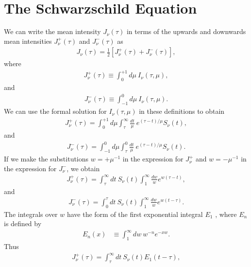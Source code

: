 \newslide

\section{The Schwarzschild Equation}

We can write the mean intensity $J_\nu(\tau)$ in terms
of the upwards and downwards mean intensities
$J_\nu^+(\tau)$ and $J_\nu^-(\tau)$ as
\begin{align}
J_\nu(\tau) = \frac{1}{2} \left[J_\nu^+(\tau) + J_\nu^-(\tau)\right],
\end{align}
where
\begin{align}
J_\nu^+(\tau) \equiv\int_{0}^{+1}\!\!\!d\mu\:I_\nu(\tau,\mu),
\end{align}
and
\begin{align}
J_\nu^-(\tau) \equiv\int_{-1}^{0}\!\!\!d\mu\:I_\nu(\tau,\mu).
\end{align}
We can use the formal solution for $I_\nu(\tau,\mu)$ in
these definitions to obtain
\begin{align}
J_\nu^+(\tau)=
\int_0^{+1}\!\!\!d\mu
\int_{\tau}^\infty\!\!\frac{dt}{\mu}\:e^{(\tau-t)/\mu} S_\nu(t),
\end{align}
and
\begin{align}
J_\nu^-(\tau)=
\int_{-1}^{0}\!\!\!d\mu
\int_{\tau}^0\!\!\frac{dt}{\mu}\:e^{(\tau-t)/\mu} S_\nu(t).
\end{align}
If we make the substitutions $w = +\mu^{-1}$ in the
expression for $J_\nu^+$ and $w = -\mu^{-1}$ in the
expression for $J_\nu^-$, we obtain
\begin{align}
J_\nu^+(\tau)=
\int_{\tau}^\infty\!\!\!dt\:
S_\nu(t)
\int_1^\infty\!\!\frac{dw}{w} e^{w(\tau-t)},
\end{align}
and
\begin{align}
J_\nu^-(\tau)=
\int_0^{\tau}\!\!\!dt\:
S_\nu(t)
\int_1^\infty\!\!\frac{dw}{w} e^{w(t-\tau)}.
\end{align}
The integrals over $w$ have the form of the first exponential
integral $E_1$ \citep[pp.\ 228-231]{Abramowitz-1972}, where
$E_n$ is defined by
\begin{align}
E_n(x) &\equiv \int_1^\infty \!\!\!dw\: w^{-n}e^{-xw}.
\end{align}
Thus
\begin{align}
J_\nu^+(\tau)=
\int_{\tau}^\infty\!\!\!dt\:
S_\nu(t)
E_1(t-\tau),
\end{align}
